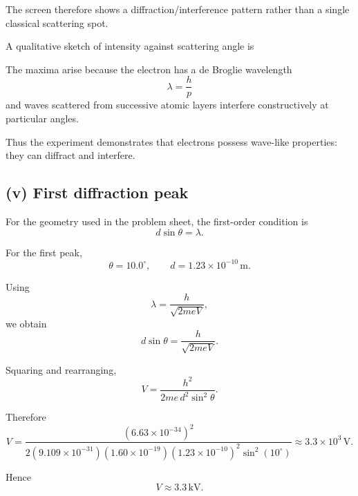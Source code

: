 \documentclass[11pt,a4paper]{article}
\begin{document}
The screen therefore shows a diffraction/interference pattern rather than a
single classical scattering spot.

A qualitative sketch of intensity against scattering angle is

\begin{center}
\end{center}

The maxima arise because the electron has a de Broglie wavelength
\[
\lambda=\frac hp
\]
and waves scattered from successive atomic layers interfere constructively at
particular angles.

Thus the experiment demonstrates that electrons possess wave-like properties:
they can diffract and interfere.

\subsection{(v) First diffraction peak}

For the geometry used in the problem sheet, the first-order condition is
\[
d\sin\theta=\lambda.
\]

For the first peak,
\[
\theta=10.0^\circ,
\qquad
d=1.23\times10^{-10}\,\mathrm m.
\]

Using
\[
\lambda=\frac{h}{\sqrt{2meV}},
\]
we obtain
\[
d\sin\theta
=
\frac{h}{\sqrt{2meV}}.
\]

Squaring and rearranging,
\[
V=
\frac{h^2}
{2me\,d^2\sin^2\theta}.
\]

Therefore
\[
V
=
\frac{(6.63\times10^{-34})^2}
{2(9.109\times10^{-31})(1.60\times10^{-19})
(1.23\times10^{-10})^2\sin^2(10^\circ)}
\approx3.3\times10^3\,\mathrm V.
\]

Hence
\[
\boxed{V\approx3.3\,\mathrm{kV}}.
\]
\end{document}
